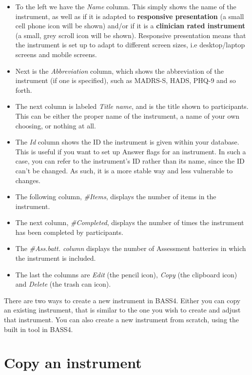 \documentclass[]{book}
\providecommand{\tightlist}{%
  \setlength{\itemsep}{0pt}\setlength{\parskip}{0pt}}
\begin{document}
\begin{itemize}
\tightlist
\item
  To the left we have the \emph{Name} column. This simply shows the name of the instrument, as well as if it is adapted to \textbf{responsive presentation} (a small cell phone icon will be shown) and/or if it is a \textbf{clinician rated instrument} (a small, grey scroll icon will be shown). Responsive presentation means that the instrument is set up to adapt to different screen sizes, i.e desktop/laptop screens and mobile screens.
\item
  Next is the \emph{Abbreviation} column, which shows the abbreviation of the instrument (if one is specified), such as MADRS-S, HADS, PHQ-9 and so forth.
\item
  The next column is labeled \emph{Title name}, and is the title shown to participants. This can be either the proper name of the instrument, a name of your own choosing, or nothing at all.
\item
  The \emph{Id} column shows the ID the instrument is given within your database. This is useful if you want to set up Answer flags for an instrument. In such a case, you can refer to the instrument's ID rather than its name, since the ID can't be changed. As such, it is a more stable way and less vulnerable to changes.
\item
  The following column, \emph{\#Items}, displays the number of items in the instrument.
\item
  The next column, \emph{\#Completed}, displays the number of times the instrument has been completed by participants.
\item
  The \emph{\#Ass.batt. column} displays the number of Assessment batteries in which the instrument is included.
\item
  The last the columns are \emph{Edit} (the pencil icon), \emph{Copy} (the clipboard icon) and \emph{Delete} (the trash can icon).
\end{itemize}

There are two ways to create a new instrument in BASS4. Either you can copy an existing instrument, that is similar to the one you wish to create and adjust that instrument. You can also create a new instrument from scratch, using the built in tool in BASS4.

\hypertarget{copy-an-instrument}{%
\section{Copy an instrument}\label{copy-an-instrument}}
\end{document}
